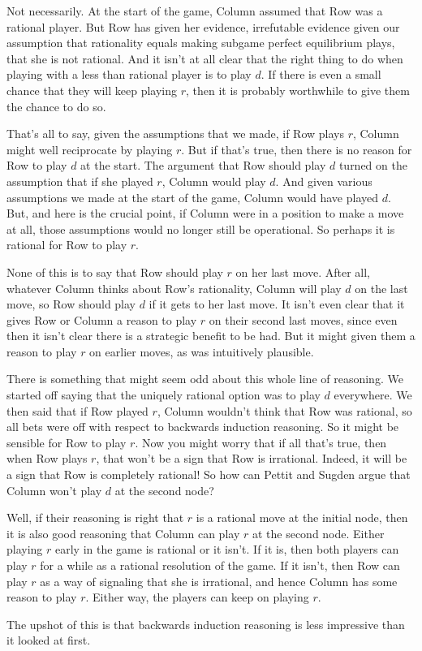 Not necessarily. At the start of the game, Column assumed that Row was a rational player. But Row has given her evidence, irrefutable evidence given our assumption that rationality equals making subgame perfect equilibrium plays, that she is not rational. And it isn't at all clear that the right thing to do when playing with a less than rational player is to play $d$. If there is even a small chance that they will keep playing $r$, then it is probably worthwhile to give them the chance to do so.

That's all to say, given the assumptions that we made, if Row plays $r$, Column might well reciprocate by playing $r$. But if that's true, then there is no reason for Row to play $d$ at the start. The argument that Row should play $d$ turned on the assumption that if she played $r$, Column would play $d$. And given various assumptions we made at the start of the game, Column would have played $d$. But, and here is the crucial point, if Column were in a position to make a move at all, those assumptions would no longer still be operational. So perhaps it is rational for Row to play $r$.

None of this is to say that Row should play $r$ on her last move. After all, whatever Column thinks about Row's rationality, Column will play $d$ on the last move, so Row should play $d$ if it gets to her last move. It isn't even clear that it gives Row or Column a reason to play $r$ on their second last moves, since even then it isn't clear there is a strategic benefit to be had. But it might given them a reason to play $r$ on earlier moves, as was intuitively plausible.

There is something that might seem odd about this whole line of reasoning. We started off saying that the uniquely rational option was to play $d$ everywhere. We then said that if Row played $r$, Column wouldn't think that Row was rational, so all bets were off with respect to backwards induction reasoning. So it might be sensible for Row to play $r$. Now you might worry that if all that's true, then when Row plays $r$, that won't be a sign that Row is irrational. Indeed, it will be a sign that Row is completely rational! So how can Pettit and Sugden argue that Column won't play $d$ at the second node?

Well, if their reasoning is right that $r$ is a rational move at the initial node, then it is also good reasoning that Column can play $r$ at the second node. Either playing $r$ early in the game is rational or it isn't. If it is, then both players can play $r$ for a while as a rational resolution of the game. If it isn't, then Row can play $r$ as a way of signaling that she is irrational, and hence Column has some reason to play $r$. Either way, the players can keep on playing $r$.

The upshot of this is that backwards induction reasoning is less impressive than it looked at first.